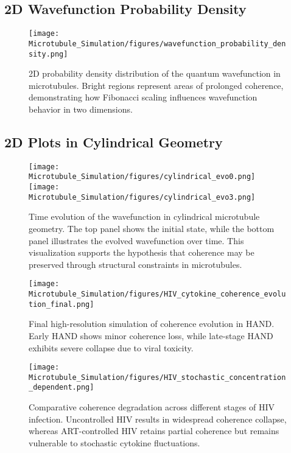 \subsection{2D Wavefunction Probability Density}
\begin{figure}[H]
    \centering
    \texttt{[image: Microtubule\_Simulation/figures/wavefunction\_probability\_density.png]}
    \caption{2D probability density distribution of the quantum wavefunction in microtubules. Bright regions represent areas of prolonged coherence, demonstrating how Fibonacci scaling influences wavefunction behavior in two dimensions.}
    \label{fig:wavefunction_2D}
\end{figure}
\subsection{2D Plots in Cylindrical Geometry}
\begin{figure}[H]
    \centering
    \texttt{[image: Microtubule\_Simulation/figures/cylindrical\_evo0.png]}
    \texttt{[image: Microtubule\_Simulation/figures/cylindrical\_evo3.png]}
    \caption{Time evolution of the wavefunction in cylindrical microtubule geometry. The top panel shows the initial state, while the bottom panel illustrates the evolved wavefunction over time. This visualization supports the hypothesis that coherence may be preserved through structural constraints in microtubules.}
    \label{fig:cylindrical_geometry}
\end{figure}
\FloatBarrier  %
\begin{figure}[H]
    \centering
    \texttt{[image: Microtubule\_Simulation/figures/HIV\_cytokine\_coherence\_evolution\_final.png]}
    \caption{Final high-resolution simulation of coherence evolution in HAND. Early HAND shows minor coherence loss, while late-stage HAND exhibits severe collapse due to viral toxicity.} \label{fig:HIV_coherence_evolution_final}
\end{figure}
\begin{figure}[H]
    \centering
    \texttt{[image: Microtubule\_Simulation/figures/HIV\_stochastic\_concentration\_dependent.png]}
    \caption{Comparative coherence degradation across different stages of HIV infection. Uncontrolled HIV results in widespread coherence collapse, whereas ART-controlled HIV retains partial coherence but remains vulnerable to stochastic cytokine fluctuations.}
    \label{fig:HIV_coherence_stages}
\end{figure}
\FloatBarrier  %